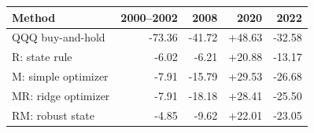 \begin{tabular}{@{}lrrrr@{}}\toprule
Method & 2000--2002 & 2008 & 2020 & 2022\\\midrule
QQQ buy-and-hold & -73.36 & -41.72 & +48.63 & -32.58\\
R: state rule & -6.02 & -6.21 & +20.88 & -13.17\\
M: simple optimizer & -7.91 & -15.79 & +29.53 & -26.68\\
MR: ridge optimizer & -7.91 & -18.18 & +28.41 & -25.50\\
RM: robust state & -4.85 & -9.62 & +22.01 & -23.05\\
\bottomrule
\end{tabular}
